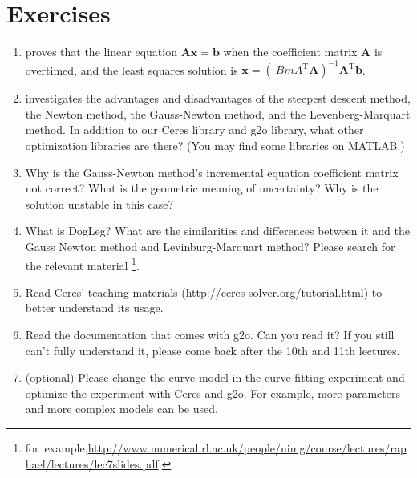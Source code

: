 \section*{ Exercises}

\begin{enumerate}
	\item proves that the linear equation $\bm{A} \bm{x} = \bm{b}$ when the coefficient matrix $\bm{A}$ is overtimed, and the least squares solution is $\bm{x} = (\ Bm{A}^\mathrm{T}\bm{A})^{-1}\bm{A}^\mathrm{T} \bm{b}$.
	\item investigates the advantages and disadvantages of the steepest descent method, the Newton method, the Gauss-Newton method, and the Levenberg-Marquart method. In addition to our Ceres library and g2o library, what other optimization libraries are there? (You may find some libraries on MATLAB.)
	\item Why is the Gauss-Newton method's incremental equation coefficient matrix not correct? What is the geometric meaning of uncertainty? Why is the solution unstable in this case?
	\item What is DogLeg? What are the similarities and differences between it and the Gauss Newton method and Levinburg-Marquart method? Please search for the relevant material \footnote{\mbox{for example,}\url{http://www.numerical.rl.ac.uk/people/nimg/course/lectures/raphael/lectures/lec7slides.pdf}. }.
	\item Read Ceres' teaching materials (\url{http://ceres-solver.org/tutorial.html}) to better understand its usage.
	\item Read the documentation that comes with g2o. Can you read it? If you still can't fully understand it, please come back after the 10th and 11th lectures.
	\item(optional) Please change the curve model in the curve fitting experiment and optimize the experiment with Ceres and g2o. For example, more parameters and more complex models can be used.
\end{enumerate}